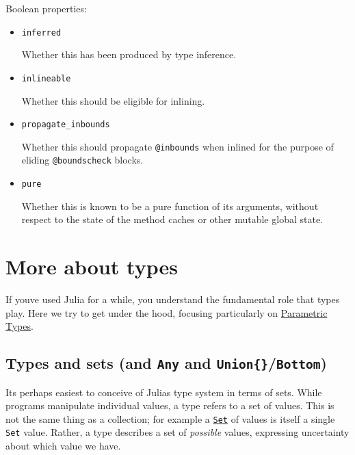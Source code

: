 Boolean properties:



\begin{itemize}
\item \texttt{inferred}

Whether this has been produced by type inference.


\item \texttt{inlineable}

Whether this should be eligible for inlining.


\item \texttt{propagate\_inbounds}

Whether this should propagate \texttt{@inbounds} when inlined for the purpose of eliding \texttt{@boundscheck} blocks.


\item \texttt{pure}

Whether this is known to be a pure function of its arguments, without respect to the state of the method caches or other mutable global state.

\end{itemize}


\hypertarget{4038509094133832716}{}


\section{More about types}



If you{\textquotesingle}ve used Julia for a while, you understand the fundamental role that types play.  Here we try to get under the hood, focusing particularly on \href{@ref}{Parametric Types}.



\hypertarget{8213772846516553388}{}


\subsection{Types and sets (and \texttt{Any} and \texttt{Union\{\}}/\texttt{Bottom})}



It{\textquotesingle}s perhaps easiest to conceive of Julia{\textquotesingle}s type system in terms of sets. While programs manipulate individual values, a type refers to a set of values. This is not the same thing as a collection; for example a \hyperlink{1143189053501747033}{\texttt{Set}} of values is itself a single \texttt{Set} value. Rather, a type describes a set of \emph{possible} values, expressing uncertainty about which value we have.



